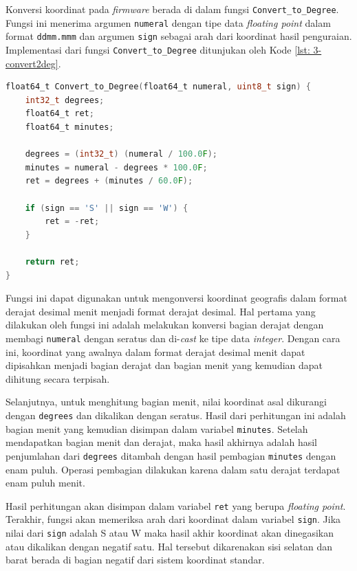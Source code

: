 Konversi koordinat pada \textit{firmware} berada di dalam fungsi \texttt{Convert\_to\_Degree}. Fungsi ini menerima argumen \texttt{numeral} dengan tipe data \textit{floating point} dalam format \texttt{ddmm.mmm} dan argumen \texttt{sign} sebagai arah dari koordinat hasil penguraian. Implementasi dari fungsi \texttt{Convert\_to\_Degree} ditunjukan oleh Kode \ref{lst: 3-convert2deg}.

\vspace{0.3cm}
\begin{lstlisting}[language=c, style=mystyle, caption={Konversi Koordinat Derajat Desimal Menit ke Derajat}, label={lst: 3-convert2deg}]
float64_t Convert_to_Degree(float64_t numeral, uint8_t sign) {
	int32_t degrees;
	float64_t ret;
	float64_t minutes;
	
	degrees = (int32_t) (numeral / 100.0F);
	minutes = numeral - degrees * 100.0F;
	ret = degrees + (minutes / 60.0F);
	
	if (sign == 'S' || sign == 'W') {
		ret = -ret;
	}
	
	return ret;
}
\end{lstlisting}

Fungsi ini dapat digunakan untuk mengonversi koordinat geografis dalam format derajat desimal menit menjadi format derajat desimal. Hal pertama yang dilakukan oleh fungsi ini adalah melakukan konversi bagian derajat dengan membagi \texttt{numeral} dengan seratus dan di-\textit{cast} ke tipe data \textit{integer}. Dengan cara ini, koordinat yang awalnya dalam format derajat desimal menit dapat dipisahkan menjadi bagian derajat dan bagian menit yang kemudian dapat dihitung secara terpisah.

Selanjutnya, untuk menghitung bagian menit, nilai koordinat asal dikurangi dengan \texttt{degrees} dan dikalikan dengan seratus. Hasil dari perhitungan ini adalah bagian menit yang kemudian disimpan dalam variabel \texttt{minutes}. Setelah mendapatkan bagian menit dan derajat, maka hasil akhirnya adalah hasil penjumlahan dari \texttt{degrees} ditambah dengan hasil pembagian \texttt{minutes} dengan enam puluh. Operasi pembagian dilakukan karena dalam satu derajat terdapat enam puluh menit.

Hasil perhitungan akan disimpan dalam variabel \texttt{ret} yang berupa \textit{floating point}. Terakhir, fungsi akan memeriksa arah dari koordinat dalam variabel \texttt{sign}. Jika nilai dari \texttt{sign} adalah S atau W maka hasil akhir koordinat akan dinegasikan atau dikalikan dengan negatif satu. Hal tersebut dikarenakan sisi selatan dan barat berada di bagian negatif dari sistem koordinat standar.

